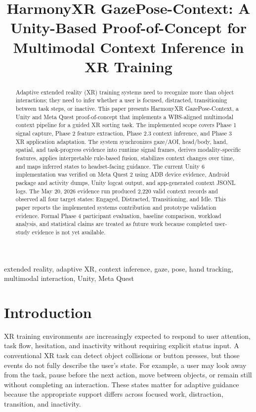 \documentclass[conference]{IEEEtran}
\title{HarmonyXR GazePose-Context: A Unity-Based Proof-of-Concept for Multimodal Context Inference in XR Training}
\author{
\IEEEauthorblockN{Varun Siddarju}
\IEEEauthorblockA{varunsiddaraju@gmail.com}
\and
\IEEEauthorblockN{Lavanya D.}
\IEEEauthorblockA{lavanyad.insight@gmail.com}
}
\begin{document}
\maketitle

\begin{abstract}
Adaptive extended reality (XR) training systems need to recognize more than object interactions; they need to infer whether a user is focused, distracted, transitioning between task steps, or inactive. This paper presents HarmonyXR GazePose-Context, a Unity and Meta Quest proof-of-concept that implements a WBS-aligned multimodal context pipeline for a guided XR sorting task. The implemented scope covers Phase 1 signal capture, Phase 2 feature extraction, Phase 2.3 context inference, and Phase 3 XR application adaptation. The system synchronizes gaze/AOI, head/body, hand, spatial, and task-progress evidence into runtime signal frames, derives modality-specific features, applies interpretable rule-based fusion, stabilizes context changes over time, and maps inferred states to headset-facing guidance. The current Unity 6 implementation was verified on Meta Quest 2 using ADB device evidence, Android package and activity dumps, Unity logcat output, and app-generated context JSONL logs. The May 20, 2026 evidence run produced 2,220 valid context records and observed all four target states: Engaged, Distracted, Transitioning, and Idle. This paper reports the implemented systems contribution and prototype validation evidence. Formal Phase 4 participant evaluation, baseline comparison, workload analysis, and statistical claims are treated as future work because completed user-study evidence is not yet available.
\end{abstract}

\begin{IEEEkeywords}
extended reality, adaptive XR, context inference, gaze, pose, hand tracking, multimodal interaction, Unity, Meta Quest
\end{IEEEkeywords}

\section{Introduction}
XR training environments are increasingly expected to respond to user attention, task flow, hesitation, and inactivity without requiring explicit status input. A conventional XR task can detect object collisions or button presses, but those events do not fully describe the user's state. For example, a user may look away from the task, pause before the next action, move between objects, or remain still without completing an interaction. These states matter for adaptive guidance because the appropriate support differs across focused work, distraction, transition, and inactivity.
\end{document}
